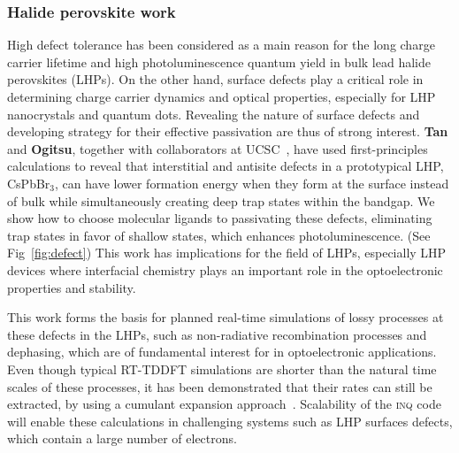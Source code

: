 \subsubsection{Halide perovskite work}

High defect tolerance has been considered as a main reason for the long charge carrier lifetime and
high photoluminescence quantum yield in bulk lead halide perovskites (LHPs). On the other hand,
surface defects play a critical role in determining charge carrier dynamics and optical properties,
especially for LHP nanocrystals and quantum dots. Revealing the nature of surface defects and
developing strategy for their effective passivation are thus of strong interest.  {\bf Tan} and {\bf Ogitsu}, together with collaborators at UCSC~\cite{Smart2021}, have used first-principles calculations to reveal that interstitial and antisite defects in a prototypical LHP, CsPbBr$_3$, can have lower formation energy when they form at the surface instead of bulk while simultaneously creating deep trap states within the bandgap.  We show how to choose molecular ligands to passivating these defects, eliminating trap states in favor of shallow states, which enhances photoluminescence. (See Fig~\ref{fig:defect}) This work has implications for  the field of LHPs, especially LHP devices where interfacial chemistry plays an important role in the optoelectronic properties and stability.

This work forms the basis for planned real-time simulations of lossy processes at these defects in the LHPs, such as non-radiative recombination processes and dephasing, which are of fundamental interest for in optoelectronic applications. Even though typical RT-TDDFT simulations are shorter than the natural time scales of these processes, it has been demonstrated that their rates can still be extracted, by using a cumulant expansion approach~\cite{Qiao2020}. Scalability of the \textsc{inq} code will enable these calculations in challenging systems such as LHP surfaces defects, which contain a large number of electrons.     


